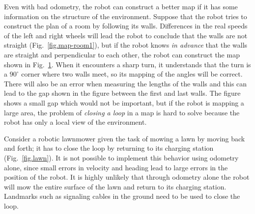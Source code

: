 Even with bad odometry, the robot can construct a better map if it has some information on the structure of the environment. Suppose that the robot tries to construct the plan of a room by following its walls. Differences in the real speeds of the left and right wheels will lead the robot to conclude that the walls are not straight (Fig.~\ref{fig.map-room1}), but if the robot knows \emph{in advance} that the walls are straight and perpendicular to each other, the robot can construct the map shown in Fig.~\ref{fig.map-room2}. When it encounters a sharp turn, it understands that the turn is a $90^\circ$ corner where two walls meet, so its mapping of the angles will be correct. There will also be an error when measuring the lengths of the walls and this can lead to the gap shown in the figure between the first and last walls. The figure shows a small gap which would not be important, but if the robot is mapping a large area, the problem of \emph{closing a loop} in a map is hard to solve because the robot has only a local view of the environment.


\begin{figure}
\subfigures
\begin{minipage}{\textwidth}
\hspace{\fill}
\label{fig.map-room1}
\label{fig.map-room2}
\end{minipage}
\end{figure}

Consider a robotic lawnmower given the task of mowing a lawn by moving back and forth; it has to close the loop by returning to its charging station (Fig.~\ref{fig.lawn}). It is not possible to implement this behavior using odometry alone, since small errors in velocity and heading lead to large errors in the position of the robot. It is highly unlikely that through odometry alone the robot will mow the entire surface of the lawn and return to its charging station. Landmarks such as signaling cables in the ground need to be used to close the loop.

